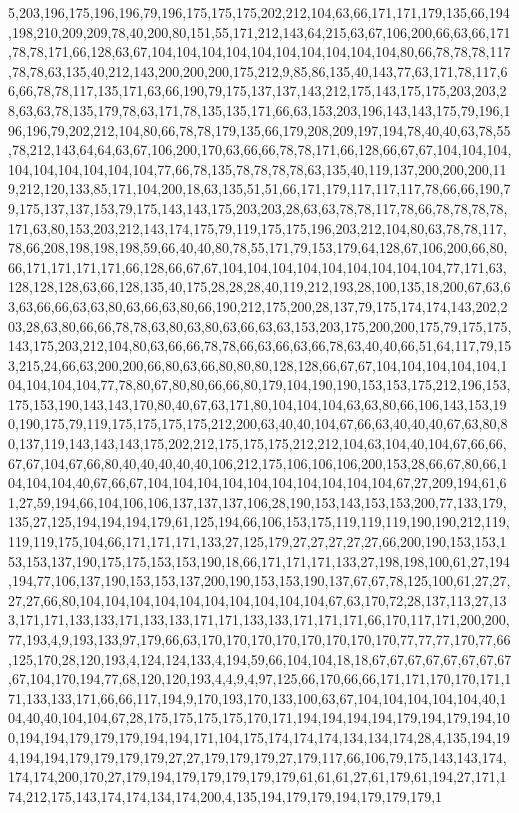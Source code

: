 5,203,196,175,196,196,79,196,175,175,175,202,212,104,63,66,171,171,179,135,66,194,198,210,209,209,78,40,200,80,151,55,171,212,143,64,215,63,67,106,200,66,63,66,171,78,78,171,66,128,63,67,104,104,104,104,104,104,104,104,104,104,80,66,78,78,78,117,78,78,63,135,40,212,143,200,200,200,175,212,9,85,86,135,40,143,77,63,171,78,117,66,66,78,78,117,135,171,63,66,190,79,175,137,137,143,212,175,143,175,175,203,203,28,63,63,78,135,179,78,63,171,78,135,135,171,66,63,153,203,196,143,143,175,79,196,196,196,79,202,212,104,80,66,78,78,179,135,66,179,208,209,197,194,78,40,40,63,78,55,78,212,143,64,64,63,67,106,200,170,63,66,66,78,78,171,66,128,66,67,67,104,104,104,104,104,104,104,104,104,77,66,78,135,78,78,78,78,63,135,40,119,137,200,200,200,119,212,120,133,85,171,104,200,18,63,135,51,51,66,171,179,117,117,117,78,66,66,190,79,175,137,137,153,79,175,143,143,175,203,203,28,63,63,78,78,117,78,66,78,78,78,78,171,63,80,153,203,212,143,174,175,79,119,175,175,196,203,212,104,80,63,78,78,117,78,66,208,198,198,198,59,66,40,40,80,78,55,171,79,153,179,64,128,67,106,200,66,80,66,171,171,171,171,66,128,66,67,67,104,104,104,104,104,104,104,104,104,77,171,63,128,128,128,63,66,128,135,40,175,28,28,28,40,119,212,193,28,100,135,18,200,67,63,63,63,66,66,63,63,80,63,66,63,80,66,190,212,175,200,28,137,79,175,174,174,143,202,203,28,63,80,66,66,78,78,63,80,63,80,63,66,63,63,153,203,175,200,200,175,79,175,175,143,175,203,212,104,80,63,66,66,78,78,66,63,66,63,66,78,63,40,40,66,51,64,117,79,153,215,24,66,63,200,200,66,80,63,66,80,80,80,128,128,66,67,67,104,104,104,104,104,104,104,104,104,77,78,80,67,80,80,66,66,80,179,104,190,190,153,153,175,212,196,153,175,153,190,143,143,170,80,40,67,63,171,80,104,104,104,63,63,80,66,106,143,153,190,190,175,79,119,175,175,175,175,212,200,63,40,40,104,67,66,63,40,40,40,67,63,80,80,137,119,143,143,143,175,202,212,175,175,175,212,212,104,63,104,40,104,67,66,66,67,67,104,67,66,80,40,40,40,40,40,106,212,175,106,106,106,200,153,28,66,67,80,66,104,104,104,40,67,66,67,104,104,104,104,104,104,104,104,104,104,67,27,209,194,61,61,27,59,194,66,104,106,106,137,137,137,106,28,190,153,143,153,153,200,77,133,179,135,27,125,194,194,194,179,61,125,194,66,106,153,175,119,119,119,190,190,212,119,119,119,175,104,66,171,171,171,133,27,125,179,27,27,27,27,27,66,200,190,153,153,153,153,137,190,175,175,153,153,190,18,66,171,171,171,133,27,198,198,100,61,27,194,194,77,106,137,190,153,153,137,200,190,153,153,190,137,67,67,78,125,100,61,27,27,27,27,66,80,104,104,104,104,104,104,104,104,104,104,67,63,170,72,28,137,113,27,133,171,171,133,133,171,133,133,171,171,133,133,171,171,171,66,170,117,171,200,200,77,193,4,9,193,133,97,179,66,63,170,170,170,170,170,170,170,170,77,77,77,170,77,66,125,170,28,120,193,4,124,124,133,4,194,59,66,104,104,18,18,67,67,67,67,67,67,67,67,67,104,170,194,77,68,120,120,193,4,4,9,4,97,125,66,170,66,66,171,171,170,170,171,171,133,133,171,66,66,117,194,9,170,193,170,133,100,63,67,104,104,104,104,104,40,104,40,40,104,104,67,28,175,175,175,175,170,171,194,194,194,194,179,194,179,194,100,194,194,179,179,179,194,194,171,104,175,174,174,174,134,134,174,28,4,135,194,194,194,194,179,179,179,179,27,27,179,179,179,27,179,117,66,106,79,175,143,143,174,174,174,200,170,27,179,194,179,179,179,179,179,61,61,61,27,61,179,61,194,27,171,174,212,175,143,174,174,134,174,200,4,135,194,179,179,194,179,179,179,1